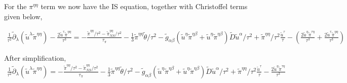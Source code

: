 \documentclass[11pt, oneside]{article}   	%
\begin{document}
For the $\pi^{\eta\eta}$ term we now have the IS equation, together with Christoffel terms given below,

\begin{eqnarray}
\frac{1}{\tau^2}\tilde{\partial}_{\lambda}(\tilde{u}^{\lambda}\tilde{\pi}^{\eta\eta}) - \frac{2\tilde{u}^{\tau}\tilde{\pi}^{\eta\eta}}{\tau^3} =   - \frac{\tilde{\pi}^{\eta\eta}/\tau^2 - \tilde{\pi}_{NS}^{\eta\eta}/\tau^2}{\tau_{\pi}} - \frac{1}{3}\tilde{\pi}^{\eta\eta}\tilde{\theta}/\tau^2 - \tilde{g}_{\alpha\beta}(\tilde{u}^{\eta}\tilde{\pi}^{\eta\beta} + \tilde{u}^{\eta} \tilde{\pi}^{\eta\beta})\tilde{D}\tilde{u}^{\alpha} /\tau^2 + \tilde{\pi}^{\eta\eta}/\tau^2\frac{\tilde{u}^{\tau}}{\tau} - \left( \frac{2\tilde{u}^{\eta}\tilde{\pi}^{\tau\eta}}{\tau^3} +\frac{2\tilde{u}^{\tau}\tilde{\pi}^{\eta\eta}}{\tau^3} \right)
\end{eqnarray}

After simplification, 
\begin{eqnarray}
\frac{1}{\tau^2}\tilde{\partial}_{\lambda}(\tilde{u}^{\lambda}\tilde{\pi}^{\eta\eta}) =   - \frac{\tilde{\pi}^{\eta\eta}/\tau^2 - \tilde{\pi}_{NS}^{\eta\eta}/\tau^2}{\tau_{\pi}} - \frac{1}{3}\tilde{\pi}^{\eta\eta}\tilde{\theta}/\tau^2 - \tilde{g}_{\alpha\beta}(\tilde{u}^{\eta}\tilde{\pi}^{\eta\beta} + \tilde{u}^{\eta} \tilde{\pi}^{\eta\beta})\tilde{D}\tilde{u}^{\alpha}/\tau^2  + \tilde{\pi}^{\eta\eta}/\tau^2\frac{\tilde{u}^{\tau}}{\tau} - \frac{2\tilde{u}^{\eta}\tilde{\pi}^{\tau\eta}}{\tau^3} 
\end{eqnarray}
\end{document}
